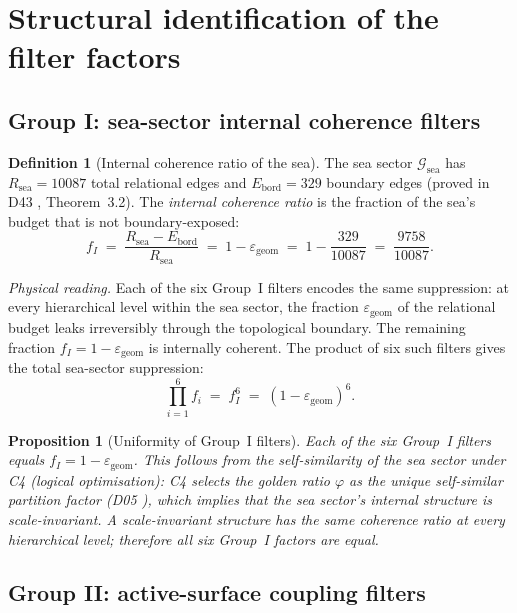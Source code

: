 \documentclass[12pt,a4paper]{article}
\newcommand{\Gsea}{\mathcal{G}_{\mathrm{sea}}}
\theoremstyle{plain}
\newtheorem{proposition}[theorem]{Proposition}
\theoremstyle{definition}
\newtheorem{definition}[theorem]{Definition}
\theoremstyle{remark}
\newcommand{\vp}{\varphi}
\newcommand{\Rsea}{R_{\mathrm{sea}}}
\newcommand{\egeom}{\varepsilon_{\mathrm{geom}}}
\begin{document}
\section{Structural identification of the filter factors}
\label{sec:derivation}

\subsection{Group I: sea-sector internal coherence filters}
\label{subsec:groupI}

\begin{definition}[Internal coherence ratio of the sea]
\label{def:fI}
The sea sector $\Gsea$ has $\Rsea = 10087$ total relational edges and $E_{\mathrm{bord}} = 329$ boundary edges (proved in D43 \citep{D43}, Theorem~3.2). The \emph{internal coherence ratio} is the fraction of the sea's budget that is not boundary-exposed:
\[
f_I \;=\; \frac{\Rsea - E_{\mathrm{bord}}}{\Rsea} \;=\; 1 - \egeom \;=\; 1 - \frac{329}{10087} \;=\; \frac{9758}{10087}.
\]
\end{definition}

\noindent \textit{Physical reading.} Each of the six Group~I filters encodes the same suppression: at every hierarchical level within the sea sector, the fraction $\egeom$ of the relational budget leaks irreversibly through the topological boundary. The remaining fraction $f_I = 1 - \egeom$ is internally coherent. The product of six such filters gives the total sea-sector suppression:
\[
\prod_{i=1}^{6} f_i \;=\; f_I^6 \;=\; (1 - \egeom)^6.
\]

\begin{proposition}[Uniformity of Group~I filters]
\label{prop:uniformI}
Each of the six Group~I filters equals $f_I = 1 - \egeom$. This follows from the self-similarity of the sea sector under C4 (logical optimisation): C4 selects the golden ratio $\vp$ as the unique self-similar partition factor (D05 \citep{D05}), which implies that the sea sector's internal structure is scale-invariant. A scale-invariant structure has the same coherence ratio at every hierarchical level; therefore all six Group~I factors are equal.
\end{proposition}

\subsection{Group II: active-surface coupling filters}
\label{subsec:groupII}
\end{document}
